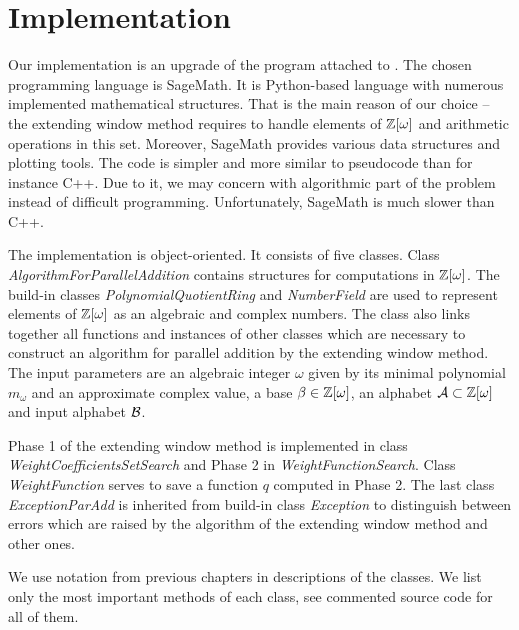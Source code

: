 \section{Implementation}

Our implementation is an upgrade of the program attached to \cite{vu}. The chosen programming language is SageMath. It is Python-based language with numerous implemented mathematical structures. That is the main reason of our choice -- the extending window method requires to handle elements of $\mathbb{Z}[\omega]$ and arithmetic operations in this set. Moreover, SageMath provides various data structures and plotting tools.  The code is simpler and more similar to pseudocode than for instance C++. Due to it, we may concern with algorithmic part of the problem instead of difficult programming. Unfortunately, SageMath is much slower than C++.


The implementation is object-oriented. It consists of five classes. Class \emph{AlgorithmForParallelAddition} contains structures for computations in $\mathbb{Z}[\omega]$. The build-in classes \emph{PolynomialQuotientRing} and \emph{NumberField} are used to represent elements of $\mathbb{Z}[\omega]$ as an algebraic and complex numbers. The class also links together all functions and instances of other classes which are necessary to construct an algorithm for parallel addition by the extending window method. The input parameters are an algebraic integer $\omega$ given by its minimal polynomial $m_\omega$ and an approximate complex value, a base $\beta\in\mathbb{Z}[\omega]$, an alphabet $\mathcal{A}\subset\mathbb{Z}[\omega]$ and input alphabet $\mathcal{B}$. 

Phase 1 of the extending window method is implemented in class \emph{WeightCoefficientsSetSearch} and Phase 2 in \emph{WeightFunctionSearch}. Class \emph{WeightFunction} serves to save a function $q$ computed in Phase 2. The last class \emph{ExceptionParAdd} is inherited from build-in class \emph{Exception} to distinguish between errors which are raised by the algorithm  of the extending window method and other ones.

We use notation from previous chapters in descriptions of the classes. We list only the most important methods of each class, see commented source code for all of them.  

